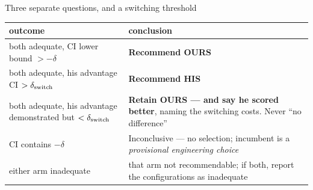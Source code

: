\documentclass[aspectratio=169,10pt]{beamer}
\newcommand{\ours}[1]{\textcolor{ours}{#1}}
\newcommand{\theirs}[1]{\textcolor{theirs}{#1}}
\newcommand{\warn}[1]{\textcolor{warn}{#1}}
\renewcommand{\arraystretch}{1.12}
\begin{document}
\begin{frame}[t]{Three separate questions, and a switching threshold}
  \begin{center}\scriptsize
  \renewcommand{\arraystretch}{1.0}
  \begin{tabular}{@{}R{0.44\textwidth}R{0.50\textwidth}@{}}
    \toprule
    \textbf{outcome} & \textbf{conclusion} \\
    \midrule
    both adequate, CI lower bound $>-\delta$ & \ours{\textbf{Recommend OURS}} \\
    both adequate, his advantage CI $>\delta_{\rm switch}$ & \theirs{\textbf{Recommend HIS}} \\
    both adequate, his advantage demonstrated but $<\delta_{\rm switch}$ &
      \warn{\textbf{Retain OURS --- and say he scored better}}, naming the switching
      costs. \warn{Never ``no difference''} \\
    CI contains $-\delta$ & \warn{Inconclusive --- no selection}; incumbent is a
      \emph{provisional engineering choice} \\
    either arm inadequate & that arm not recommendable; if both, report the
      configurations as inadequate \\
    \bottomrule
  \end{tabular}
  \end{center}
\end{frame}
\end{document}
